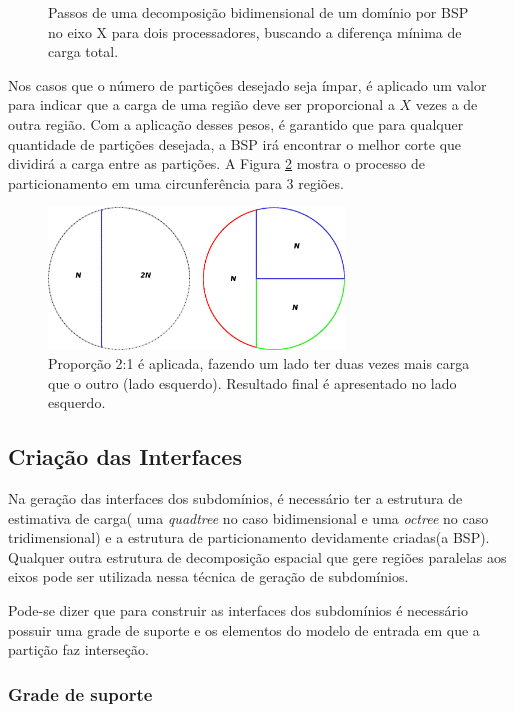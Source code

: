 \begin{figure}[ht]
{	}
	\caption{Passos de uma decomposição bidimensional de um domínio por BSP no eixo X para dois processadores, buscando a diferença mínima de carga total.}
	\label{fig:passos_decomposicao_BSP}
\end{figure}


Nos casos que o número de partições desejado seja ímpar, é aplicado um valor para indicar que a carga de uma região deve ser proporcional a $X$ vezes a de outra região. Com a aplicação desses pesos, é garantido que para qualquer quantidade de partições desejada, a BSP irá encontrar o melhor corte que dividirá a carga entre as partições. A Figura \ref{fig:circunferencia_cortejunto} mostra o processo de particionamento em uma circunferência para 3 regiões.

\begin{figure}[!ht]
	\centering
	\includegraphics[width=0.7\textwidth]{fig/circunferencia_cortejunto.png}
	\caption{Proporção 2:1 é aplicada, fazendo um lado ter duas vezes mais carga que o outro (lado esquerdo). Resultado final é apresentado no lado esquerdo.}
	\label{fig:circunferencia_cortejunto}
\end{figure}

\subsection{Criação das Interfaces}

Na geração das interfaces dos subdomínios, é necessário ter a estrutura de estimativa de carga( uma \textit{quadtree} no caso bidimensional e uma \textit{octree} no caso tridimensional) e a estrutura de particionamento devidamente criadas(a BSP). Qualquer outra estrutura de decomposição espacial que gere regiões paralelas aos eixos pode ser utilizada nessa técnica de geração de subdomínios. 

Pode-se dizer que para construir as interfaces dos subdomínios é necessário possuir uma grade de suporte e os elementos do modelo de entrada em que a partição faz interseção.

\subsubsection{Grade de suporte}

